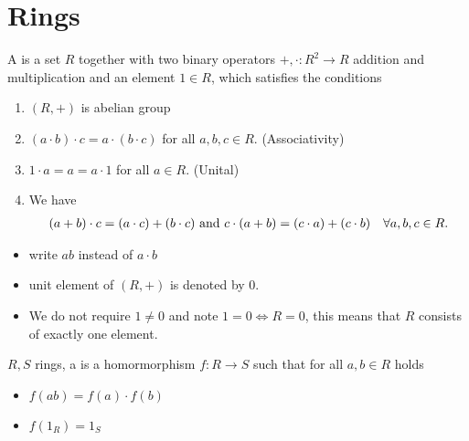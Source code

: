 \section{Rings}
\begin{definition}[ring]
	A  is a set $R$ together with two binary operators $+,\cdot \colon R^2 \to R$ addition and multiplication and an element $1 \in R$, which satisfies the conditions
	\begin{enumerate}
		\item $(R,+)$ is abelian group
		\item $(a\cdot b)\cdot c = a \cdot (b\cdot c)$ for all $a,b,c \in R$. (Associativity)
		\item $1\cdot a = a = a \cdot 1$ for all $a \in R$. (Unital)
		\item We have
		\begin{align*}
			(a+b)\cdot c = (a\cdot c) + (b \cdot c) \text{ and } c\cdot (a+b) = (c\cdot a) + (c \cdot b) \quad \forall a,b,c \in R.
		\end{align*}
	\end{enumerate}
\end{definition}
\begin{*remark}
	\begin{itemize}
		\item write $ab$ instead of $a\cdot b$
		\item unit element of $(R,+)$ is denoted by 0.
		\item We do not require $1\neq 0$ and note $1=0 \iff R = 0$, this means that $R$ consists of exactly one element.
	\end{itemize}
\end{*remark}
\begin{definition}
	$R,S$ rings, a  is a homormorphism $f\colon R \to S$ such that for all $a,b \in R$ holds
	\begin{itemize}
		\item $f(ab) = f(a)\cdot f(b)$
		\item $f(1_R) = 1_S$
	\end{itemize}
\end{definition}
